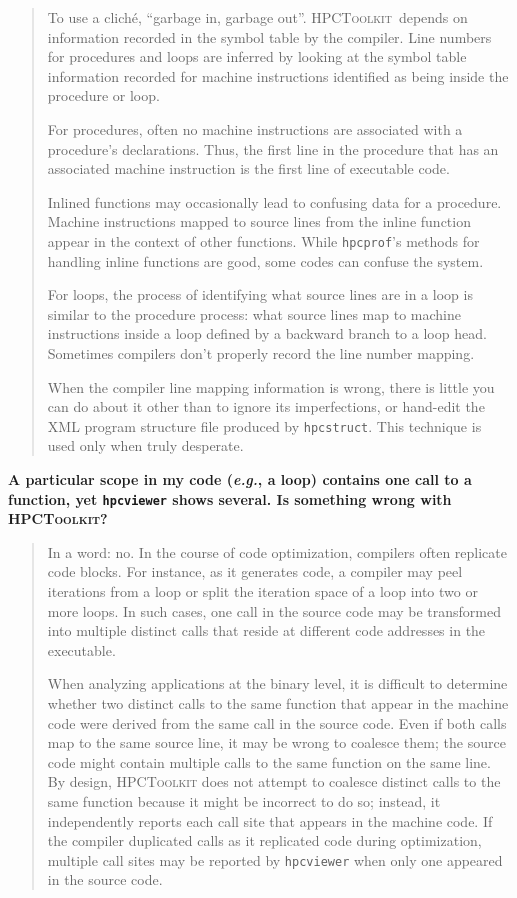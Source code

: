 \documentclass{article}
\newcommand{\hpctoolkit}{\textsc{HPCToolkit}}
\newcommand{\hpcstruct}{\texttt{hpcstruct}}
\newcommand{\hpcprof}{\texttt{hpcprof}}
\newcommand{\hpcviewer}{\texttt{hpcviewer}}
\newcommand{\eg}{{\em e.g.}}
\begin{document}
\begin{quote}
To use a clich\'{e}, ``garbage in, garbage out''. \hpctoolkit\ 
depends on information recorded in the symbol table by the
compiler. Line numbers for procedures and loops are inferred by
looking at the symbol table information recorded for machine
instructions identified as being inside the procedure or loop.


For procedures, often no machine instructions are associated with a
procedure's declarations. Thus, the first line in the procedure that
has an associated machine instruction is the first line of executable
code.

Inlined functions may occasionally lead to confusing data for a
procedure. Machine instructions mapped to source lines from the inline
function appear in the context of other functions. While \hpcprof 's
methods for handling inline functions are good, some codes can confuse
the system.

For loops, the process of identifying what source lines are in a loop
is similar to the procedure process: what source lines map to machine
instructions inside a loop defined by a backward branch to a loop
head. Sometimes compilers don't properly record the line number
mapping.

When the compiler line mapping information is wrong, there is little
you can do about it other than to ignore its imperfections, or
hand-edit the XML program structure file produced by \hpcstruct . This
technique is used only when truly desperate.
\end{quote}

\textbf{A particular scope in my code (\eg, a loop) contains one call to a 
function, yet \hpcviewer{} shows several. Is something wrong with \hpctoolkit{}?}
\begin{quote}
In a word: no. In the course of code optimization, compilers often replicate code blocks. 
For instance, as it generates code, a compiler may peel iterations from a loop or split the iteration 
space of a loop into two or more loops. 
In such cases, one call in the source code may be transformed into multiple 
distinct calls that reside at different code addresses in the executable. 

When analyzing applications at the binary level, it is difficult to 
determine whether two distinct calls to the same function that appear in the machine 
code were derived from the same call in the source code. 
Even if both calls map to the same source line, it may be wrong to coalesce them; 
the source code might contain multiple calls to the same function on the same line. 
By design, \hpctoolkit{} does not attempt to coalesce distinct calls to the same function
because it might be incorrect to do so; instead, it independently reports each call site 
that appears in the machine code. 
If the compiler duplicated calls as it replicated code during optimization,  
multiple call sites may be reported by \hpcviewer{} when only one appeared in the source code. 
\end{quote}
\end{document}

